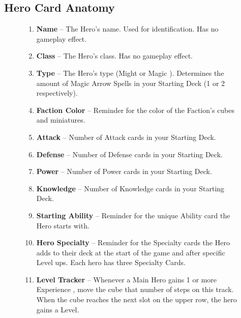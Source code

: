 \clearpage

\subsection*{\hypertarget{Herocard}{Hero Card Anatomy}}
\bigbreak
\begin{figure}[h]
  \begin{minipage}[t]{0.5\textwidth}
    \vspace{0pt}
    \begin{enumerate}[itemsep=5pt]
      \item \textbf{Name} – The Hero's name.
        Used for identification.
        Has no gameplay effect.
      \item \textbf{Class} – The Hero's class.
        Has no gameplay effect.
      \item \textbf{Type} – The Hero's type (Might  or Magic ).
        Determines the amount of Magic Arrow Spells in your Starting Deck (1 or 2 respectively).
      \item \textbf{Faction Color} – Reminder for the color of the Faction's cubes and miniatures.
      \item \textbf{Attack} – Number of Attack cards in your Starting Deck.
      \item \textbf{Defense} – Number of Defense cards in your Starting Deck.
      \item \textbf{Power} – Number of Power cards in your Starting Deck.
      \item \textbf{Knowledge} – Number of Knowledge cards in your Starting Deck.
      \item \textbf{Starting Ability} – Reminder for the unique Ability card the Hero starts with.
      \item \textbf{Hero Specialty} – Reminder for the Specialty cards the Hero adds to their deck at the start of the game and after specific Level ups.
        Each hero has three Specialty Cards.
      \item \textbf{Level Tracker} – Whenever a Main Hero gains 1 or more Experience , move the cube that number of steps on this track.
        When the cube reaches the next slot on the upper row, the hero gains a Level.
    \end{enumerate}
  \end{minipage}\hfill
  \begin{minipage}[t]{0.48\textwidth}
    \centering

\end{minipage}
\end{figure}
